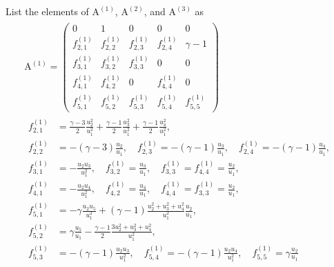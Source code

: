 \documentclass{turgon}
\begin{document}
List the elements of $\mathrm{A^{(1)}}$, $\mathrm{A^{(2)}}$, and
$\mathrm{A^{(3)}}$ as
%
\begin{gather}
  \begin{gathered}
    \mathrm{A}^{(1)} = \left(
    \begin{array}{ccccc}
      0             & 1             & 0             & 0             & 0 \\
      f^{(1)}_{2,1} & f^{(1)}_{2,2} & f^{(1)}_{2,3} & f^{(1)}_{2,4} &
      \gamma - 1 \\
      f^{(1)}_{3,1} & f^{(1)}_{3,2} & f^{(1)}_{3,3} & 0             & 0 \\
      f^{(1)}_{4,1} & f^{(1)}_{4,2} & 0             & f^{(1)}_{4,4} & 0 \\
      f^{(1)}_{5,1} & f^{(1)}_{5,2} & f^{(1)}_{5,3} & f^{(1)}_{5,4} &
      f^{(1)}_{5,5}
    \end{array}
    \right)
    \\
    \begin{aligned}
      f^{(1)}_{2,1} &= \frac{\gamma-3}{2}\frac{u_2^2}{u_1^2}
      + \frac{\gamma-1}{2}\frac{u_3^2}{u_1^2}
      + \frac{\gamma-1}{2}\frac{u_4^2}{u_1^2}, \\
      f^{(1)}_{2,2} &= -(\gamma-3)\frac{u_2}{u_1}, \quad
      f^{(1)}_{2,3} = -(\gamma-1)\frac{u_3}{u_1}, \quad
      f^{(1)}_{2,4} = -(\gamma-1)\frac{u_4}{u_1}, \\
      f^{(1)}_{3,1} &= -\frac{u_2 u_3}{u_1^2}, \quad
      f^{(1)}_{3,2} = \frac{u_3}{u_1}, \quad
      f^{(1)}_{3,3} = f^{(1)}_{4,4} = \frac{u_2}{u_1}, \\
      f^{(1)}_{4,1} &= -\frac{u_2 u_4}{u_1^2}, \quad
      f^{(1)}_{4,2} = \frac{u_4}{u_1}, \quad
      f^{(1)}_{4,4} = f^{(1)}_{3,3} = \frac{u_2}{u_1}, \\
      f^{(1)}_{5,1} &= -\gamma\frac{u_2 u_5}{u_1^2}
      + (\gamma-1)\frac{u_2^2+u_3^2+u_4^2}{u_1^2}\frac{u_2}{u_1}, \\
      f^{(1)}_{5,2} &= \gamma\frac{u_5}{u_1}
      - \frac{\gamma-1}{2}\frac{3u_2^2 + u_3^2 + u_4^2}{u_1^2}, \\
      f^{(1)}_{5,3} &= -(\gamma-1)\frac{u_2 u_3}{u_1^2}, \quad
      f^{(1)}_{5,4} = -(\gamma-1)\frac{u_2 u_4}{u_1^2}, \quad
      f^{(1)}_{5,5} = \gamma\frac{u_2}{u_1}
    \end{aligned}
  \end{gathered}
  \label{e:euler:jaco1}
\end{gather}
%
\end{document}
